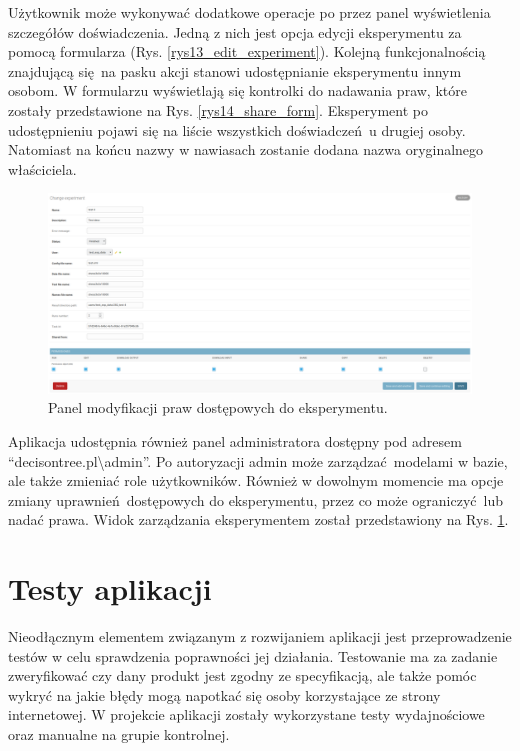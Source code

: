 Użytkownik może wykonywać dodatkowe operacje po przez panel wyświetlenia szczegółów doświadczenia. Jedną z nich jest opcja edycji eksperymentu za pomocą formularza (Rys. \ref{rys13_edit_experiment}). Kolejną funkcjonalnością znajdującą się na pasku akcji stanowi udostępnianie eksperymentu innym osobom. W formularzu wyświetlają się kontrolki do nadawania praw, które zostały przedstawione na Rys. \ref{rys14_share_form}. Eksperyment po udostępnieniu pojawi się na liście wszystkich doświadczeń u drugiej osoby. Natomiast na końcu nazwy w nawiasach zostanie dodana nazwa oryginalnego właściciela. 


\begin{figure}[htb]
	\centering
	\includegraphics[width=15cm]{grafika/admin_exp.eps}
	\caption{Panel modyfikacji praw dostępowych do eksperymentu.}
	\label{rys20_admin_exp}
\end{figure}

Aplikacja udostępnia również panel administratora dostępny pod adresem \enquote{decisontree.pl\textbackslash{admin}}. Po autoryzacji admin może zarządzać modelami w bazie, ale także zmieniać role użytkowników. Również w dowolnym momencie ma opcje zmiany uprawnień dostępowych do eksperymentu, przez co może ograniczyć lub nadać prawa. Widok zarządzania eksperymentem został przedstawiony na Rys. \ref{rys20_admin_exp}.

\section{Testy aplikacji}
Nieodłącznym elementem związanym z rozwijaniem aplikacji jest przeprowadzenie testów w celu sprawdzenia poprawności jej działania. Testowanie ma za zadanie zweryfikować czy dany produkt jest zgodny ze specyfikacją, ale także pomóc wykryć na jakie błędy mogą napotkać się osoby korzystające ze strony internetowej. W projekcie aplikacji zostały wykorzystane testy wydajnościowe oraz manualne na grupie kontrolnej.
 
